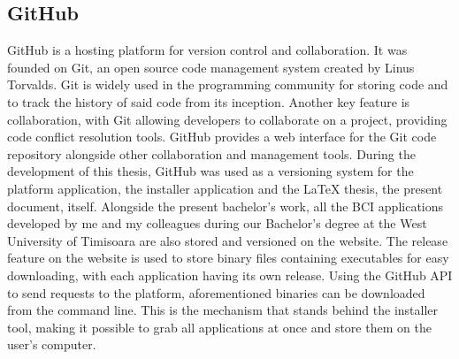 \subsection{GitHub}
GitHub is a hosting platform for version control and collaboration\cite{github_HelloWorlds}. It was founded on Git, an open source code management system created by Linus Torvalds. Git is widely used in the programming community for storing code and to track the history of said code from its inception. Another key feature is collaboration, with Git allowing developers to collaborate on a project, providing code conflict resolution tools. GitHub provides a web interface for the Git code repository alongside other collaboration and management tools\cite{whatsGithub}. During the development of this thesis, GitHub was used as a versioning system for the platform application, the installer application and the LaTeX thesis, the present document, itself.
\vspace{\baselineskip}\newline
Alongside the present bachelor's work, all the BCI applications developed by me and my colleagues during our Bachelor's degree at the West University of Timisoara are also stored and versioned on the website. The release feature on the website is used to store binary files containing executables for easy downloading, with each application having its own release. Using the GitHub API to send requests to the platform, aforementioned binaries can be downloaded from the command line. This is the mechanism that stands behind the installer tool, making it possible to grab all applications at once and store them on the user's computer.

